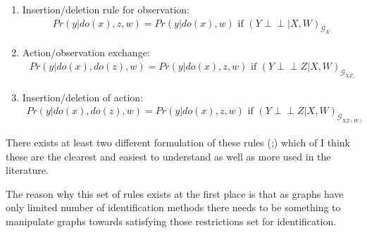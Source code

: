 \documentclass[main=english,12pt,a4paper,pdftex,econ,utf8]{aaltothesis}
\newcommand{\indep}{\perp \!\!\! \perp}
\newcommand{\g}{\mathcal{G}}
\begin{document}
\begin{enumerate}
    \item Insertion/deletion rule for observation:
        \begin{gather}
            Pr(y|do(x),z,w)=Pr(y|do(x),w)\text{ if }(Y\indep |X,W)_{\g_{\overline{X}}}
        \end{gather}
    \item Action/observation exchange:
        \begin{gather}
            Pr(y|do(x), do(z), w)=Pr(y|do(x),z,w)\text{ if }(Y\indep Z|X,W)_{\g_{\overline{X}\underline{Z}}}
        \end{gather}
    \item Insertion/deletion of action:
        \begin{gather}
            Pr(y|do(x),do(z),w)=Pr(y|do(x),z,w)\text{ if }(Y\indep Z|X,W)_{\g_{\overline{XZ(W)}}}
        \end{gather}
\end{enumerate}

\noindent There exists at least two different formulation of these rules (\cite{Jud1995};\cite{Pearl2009a}) which of I think these are the clearest and easiest to understand as well as more used in the literature.

The reason why this set of rules exists at the first place is that as graphs have only limited number of identification methods there needs to be something to manipulate graphs towards satisfying those restrictions set for identification. 

\clearpage

\printbibliography
\end{document}
